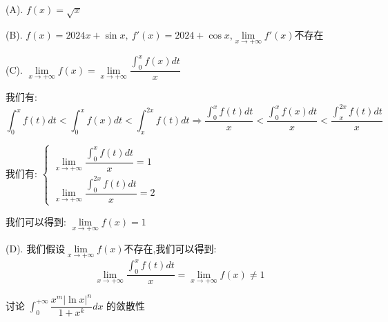 \begin{solution}

	(A). $f(x)=\sqrt{x}$
	
	(B). $f(x)=2024x+\sin x,\ f'(x)=2024+\cos x$,$\lim\limits_{x\to +\infty}f'(x)\text{不存在}$
	
	(C). $\lim\limits_{x\to +\infty}f(x)=\lim\limits_{x\to+\infty}\dfrac{\int_{0}^{x}f(x)dt}{x}$
	
	我们有:  $$\int_{0}^{x}f(t)dt<\int_{0}^{x}f(x)dt<\int_{x}^{2x}f(t)dt\Rightarrow \dfrac{\int_{0}^{x}f(t)dt}{x}<\dfrac{\int_{0}^{x}f(x)dt}{x}<\dfrac{\int_{x}^{2x}f(t)dt}{x}$$
	
	我们有:  $\left\lbrace
	\begin{array}{l}
		\lim\limits_{x\to+\infty}\dfrac{\int_{0}^{x}f(t)dt}{x}=1\\
		\lim\limits_{x\to+\infty}\dfrac{\int_{0}^{2x}f(t)dt}{x}=2
	\end{array}
	\right. $
	
	我们可以得到:  $\lim\limits_{x\to +\infty}f(x)=1$
	
	(D). 我们假设$\lim\limits_{x\to +\infty}f(x)$不存在,我们可以得到:  
	$$\lim\limits_{x\to +\infty}\dfrac{\int_{0}^{x}f(t)dt}{x}=\lim\limits_{x\to+\infty}f(x)\neq 1$$
	
\end{solution}

\begin{example}[][Exam: 35.2.14]
	讨论 $\int_{0}^{+\infty}\dfrac{x^m|\ln x|^n}{1+x^k}dx$ 的敛散性
\end{example}

